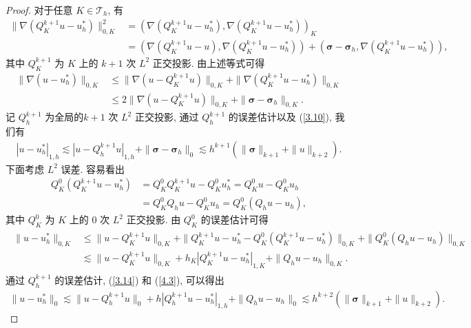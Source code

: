 	\begin{proof}
		对于任意 $K\in\mathcal{T}_h$, 有
		\begin{align*}
			\|\nabla(Q^{k+1}_K u-u^\ast_h)\|^2_{0,K}&=(\nabla(Q^{k+1}_K u-u^\ast_h),\nabla(Q^{k+1}_K u-u^\ast_h))_K\\
			&=(\nabla(Q^{k+1}_K u-u),\nabla(Q^{k+1}_K u-u^\ast_h))+(\boldsymbol\sigma-\boldsymbol\sigma_h,\nabla(Q^{k+1}_K u-u^\ast_h)),
		\end{align*}
		其中 $Q^{k+1}_K$ 为 $K$ 上的 $k+1$ 次 $L^2$ 正交投影. 由上述等式可得
		\begin{align*}
			\|\nabla(u-u^\ast_h)\|_{0,K}&\leq\|\nabla(u-Q^{k+1}_K u)\|_{0,K}+\|\nabla(Q^{k+1}_K u-u^\ast_h)\|_{0,K}\\
			&\leq 2\|\nabla(u-Q^{k+1}_K u)\|_{0,K}+\|\boldsymbol\sigma-\boldsymbol\sigma_h\|_{0,K}.
		\end{align*}
		记 $Q^{k+1}_h$ 为全局的$k+1$ 次 $L^2$ 正交投影, 通过 $Q^{k+1}_h$ 的误差估计以及 (\ref{3.10}), 我们有
		\begin{align}
			\label{4.3}
			|u-u^\ast_h|_{1,h}\lesssim|u-Q^{k+1}_h u|_{1,h}+\|\boldsymbol\sigma-\boldsymbol\sigma_h\|_0\lesssim h^{k+1}(\|\boldsymbol\sigma\|_{k+1}+\|u\|_{k+2}).
		\end{align}
		下面考虑 $L^2$ 误差. 容易看出
		\begin{align*}
			Q^0_K(Q^{k+1}_K u-u^\ast_h)&=Q^0_KQ^{k+1}_K u-Q^0_K u^\ast_h=Q^0_K u-Q^0_K u_h\\
			&=Q^0_K Q_h u-Q^0_K u_h=Q^0_K(Q_h u-u_h),
		\end{align*}
		其中 $Q^0_K$ 为 $K$ 上的 $0$ 次 $L^2$ 正交投影. 由 $Q^0_K$ 的误差估计可得
		\begin{align}\begin{split}
			\label{4.4}
			\|u-u^\ast_h\|_{0,K}&\leq \|u-Q^{k+1}_K u\|_{0,K}+\|Q^{k+1}_K u-u^\ast_h-Q^0_K(Q^{k+1}_K u-u^\ast_h)\|_{0,K}+\|Q^0_K(Q_h u-u_h)\|_{0,K}\\
			&\lesssim\|u-Q^{k+1}_K u\|_{0,K}+h_K|Q^{k+1}_K u-u^\ast_h|_{1,K}+\|Q_h u-u_h\|_{0,K}.
			\end{split}
		\end{align}
		通过 $Q^{k+1}_h$ 的误差估计, (\ref{3.14}) 和 (\ref{4.3}), 可以得出
		\begin{align*}
			\|u-u^\ast_h\|_0\lesssim\|u-Q^{k+1}_h u\|_0+h|Q^{k+1}_h u-u^\ast_h|_{1,h}+\|Q_h u-u_h\|_0\lesssim h^{k+2}(\|\boldsymbol\sigma\|_{k+1}+\|u\|_{k+2}).
		\end{align*}
	\end{proof}

